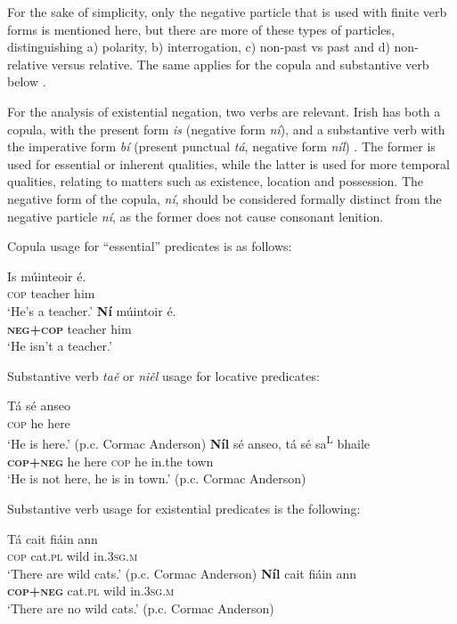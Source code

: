 \documentclass[output=paper]{langsci/langscibook}
\begin{document}
\begin{unindented}
For the sake of simplicity, only the negative particle that is used with
finite verb forms is mentioned here, but there are more of these types of
particles, distinguishing a) polarity, b) interrogation, c) non-past vs
past and d) non-relative versus relative. The same applies for the copula
and substantive verb below \parencite[see][93]{Stenson1981}. 

For the analysis of existential negation, two verbs are relevant. Irish has both a copula, with the present form \textit{is} (negative form \textit{ní}), and a substantive verb with the imperative form \textit{bí} (present punctual \textit{tá}, negative form \textit{níl}) \citep[94]{Stenson1981}. The former is used for essential or inherent qualities, while the latter is used for more temporal qualities, relating to matters such as existence, location and possession. The negative form of the copula, \textit{ní}, should be considered formally distinct from the negative particle \textit{ní}, as the former does not cause consonant lenition. 

Copula usage for ``essential'' predicates is as follows:
%
\begin{exe}\ex \gll Is múinteoir é.  \\
\textsc{cop} teacher him \\
    \glt `He's a teacher.' \citep[132]{Stenson1981}
\ex \gll \textbf{Ní} múintoir é.  \\
\textbf{\textsc{neg+cop}} teacher   him \\
    \glt `He isn't a teacher.' \citep[132]{Stenson1981}
    \end{exe}

Substantive verb \textit{taě} or \textit{niěl} usage for locative predicates:
%
\begin{exe}\ex \gll Tá sé anseo \\
\textsc{cop} he here \\
    \glt `He is here.' (p.c. Cormac Anderson)
\ex \gll \textbf{Níl} sé anseo,  tá sé sa\textsuperscript{L} bhaile \\
\textbf{\textsc{cop+neg}} he here \textsc{cop} he in.the  town \\
    \glt `He is not here, he is in town.' (p.c. Cormac Anderson)
    \end{exe}

Substantive verb usage for existential predicates is the following:
%
\begin{exe}\ex \gll Tá cait    fiáin ann \\
\textsc{cop} cat.\textsc{pl} wild in.\textsc{3sg.m} \\
    \glt `There are wild cats.' (p.c. Cormac Anderson)
\ex \gll \textbf{Níl} cait   fiáin ann \\
\textbf{\textsc{cop+neg}} cat.\textsc{pl} wild in.\textsc{3sg.m} \\
    \glt `There are no wild cats.' (p.c. Cormac Anderson)
    \end{exe}


\end{unindented}
\end{document}
